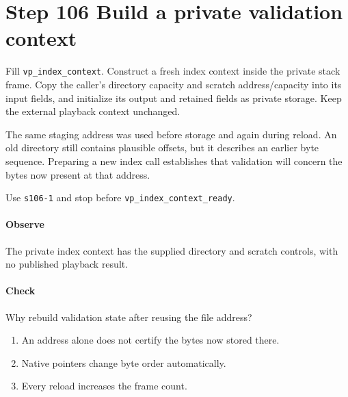 \section{Step 106 Build a private validation context}
Fill \texttt{vp\_index\_context}. Construct a fresh index context inside the private stack frame. Copy the caller's directory capacity and scratch address/capacity into its input fields, and initialize its output and retained fields as private storage. Keep the external playback context unchanged.

The same staging address was used before storage and again during reload. An old directory still contains plausible offsets, but it describes an earlier byte sequence. Preparing a new index call establishes that validation will concern the bytes now present at that address.

Use \texttt{s106-1} and stop before \texttt{vp\_index\_context\_ready}.

\paragraph{Observe} The private index context has the supplied directory and scratch controls, with no published playback result.

\paragraph{Check} Why rebuild validation state after reusing the file address?
\begin{enumerate}[label=\Alph*.]
  \item An address alone does not certify the bytes now stored there.
  \item Native pointers change byte order automatically.
  \item Every reload increases the frame count.
\end{enumerate}
